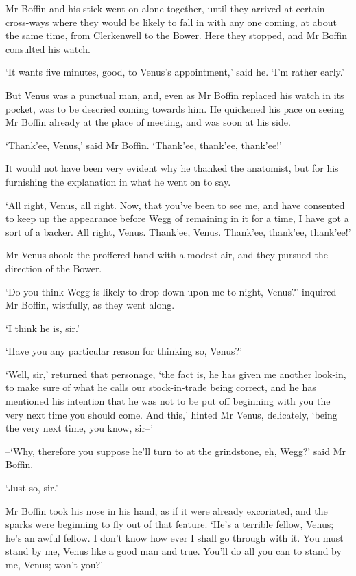 Mr Boffin and his stick went on alone together, until they arrived at
certain cross-ways where they would be likely to fall in with any one
coming, at about the same time, from Clerkenwell to the Bower. Here they
stopped, and Mr Boffin consulted his watch.

‘It wants five minutes, good, to Venus’s appointment,’ said he. ‘I’m
rather early.’

But Venus was a punctual man, and, even as Mr Boffin replaced his watch
in its pocket, was to be descried coming towards him. He quickened his
pace on seeing Mr Boffin already at the place of meeting, and was soon
at his side.

‘Thank’ee, Venus,’ said Mr Boffin. ‘Thank’ee, thank’ee, thank’ee!’

It would not have been very evident why he thanked the anatomist, but
for his furnishing the explanation in what he went on to say.

‘All right, Venus, all right. Now, that you’ve been to see me, and have
consented to keep up the appearance before Wegg of remaining in it for a
time, I have got a sort of a backer. All right, Venus. Thank’ee, Venus.
Thank’ee, thank’ee, thank’ee!’

Mr Venus shook the proffered hand with a modest air, and they pursued
the direction of the Bower.

‘Do you think Wegg is likely to drop down upon me to-night, Venus?’
inquired Mr Boffin, wistfully, as they went along.

‘I think he is, sir.’

‘Have you any particular reason for thinking so, Venus?’

‘Well, sir,’ returned that personage, ‘the fact is, he has given me
another look-in, to make sure of what he calls our stock-in-trade being
correct, and he has mentioned his intention that he was not to be put
off beginning with you the very next time you should come. And this,’
hinted Mr Venus, delicately, ‘being the very next time, you know, sir--’

--‘Why, therefore you suppose he’ll turn to at the grindstone, eh,
Wegg?’ said Mr Boffin.

‘Just so, sir.’

Mr Boffin took his nose in his hand, as if it were already excoriated,
and the sparks were beginning to fly out of that feature. ‘He’s a
terrible fellow, Venus; he’s an awful fellow. I don’t know how ever I
shall go through with it. You must stand by me, Venus like a good man
and true. You’ll do all you can to stand by me, Venus; won’t you?’

